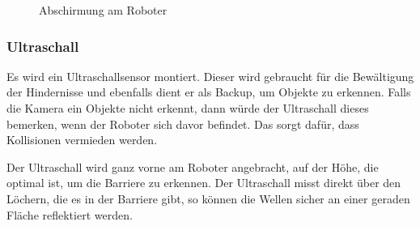 \begin{figure}[H]
\begin{minipage}[b]{0.45\textwidth}
  \caption{Abschirmung am Roboter}
  \label{fig:abschirmung-robi}
\end{minipage}
\end{figure}


\subsubsection{Ultraschall}

Es wird ein Ultraschallsensor montiert. Dieser wird gebraucht für die Bewältigung der Hindernisse und ebenfalls dient er als Backup, um Objekte zu erkennen. Falls die Kamera ein Objekte nicht erkennt, dann würde der Ultraschall dieses bemerken, wenn der Roboter sich davor befindet. Das sorgt dafür, dass Kollisionen vermieden werden.

Der Ultraschall wird ganz vorne am Roboter angebracht, auf der Höhe, die optimal ist, um die Barriere zu erkennen. Der Ultraschall misst direkt über den Löchern, die es in der Barriere gibt, so können die Wellen sicher an einer geraden Fläche reflektiert werden.

